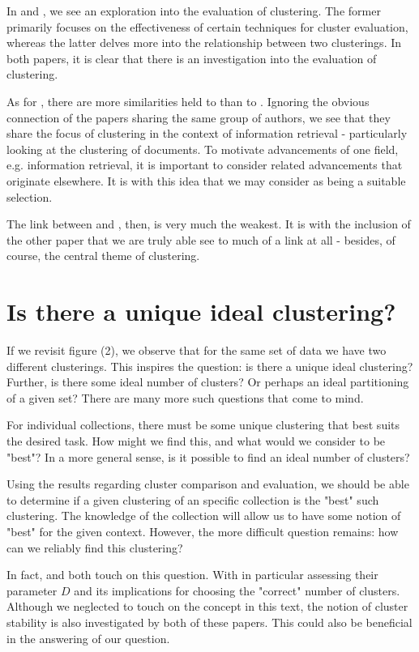 \documentclass[sigconf,authorversion,nonacm]{acmart}
\begin{document}
In \cite{Yuan2022} and \cite{Cazals2019}, we see an exploration into the evaluation of clustering. The former primarily focuses on the effectiveness of certain techniques for cluster evaluation, whereas the latter delves more into the relationship between two clusterings. In both papers, it is clear that there is an investigation into the evaluation of clustering.

As for \cite{Yuan2021}, there are more similarities held to \cite{Yuan2022} than to \cite{Cazals2019}. Ignoring the obvious connection of the papers sharing the same group of authors, we see that they share the focus of clustering in the context of information retrieval - particularly looking at the clustering of documents. To motivate advancements of one field, e.g. information retrieval, it is important to consider related advancements that originate elsewhere. It is with this idea that we may consider \cite{Cazals2019} as being a suitable selection.

The link between \cite{Yuan2021} and \cite{Cazals2019}, then, is very much the weakest. It is with the inclusion of the other paper that we are truly able see to much of a link at all - besides, of course, the central theme of clustering. 
\section{Is there a unique ideal clustering?}
If we revisit figure (2), we observe that for the same set of data we have two different clusterings. This inspires the question: is there a unique ideal clustering? Further, is there some ideal number of clusters? Or perhaps an ideal partitioning of a given set? There are many more such questions that come to mind.

For individual collections, there must be some unique clustering that best suits the desired task. How might we find this, and what would we consider to be "best"? In a more general sense, is it possible to find an ideal number of clusters?

Using the results regarding cluster comparison and evaluation, we should be able to determine if a given clustering of an specific collection is the "best" such clustering. The knowledge of the collection will allow us to have some notion of "best" for the given context. However, the more difficult question remains: how can we reliably find this clustering?

In fact, \cite{Yuan2022} and \cite{Cazals2019} both touch on this question. With \cite{Cazals2019} in particular assessing their parameter $D$ and its implications for choosing the "correct" number of clusters. Although we neglected to touch on the concept in this text, the notion of cluster stability is also investigated by both of these papers. This could also be beneficial in the answering of our question.
\end{document}
